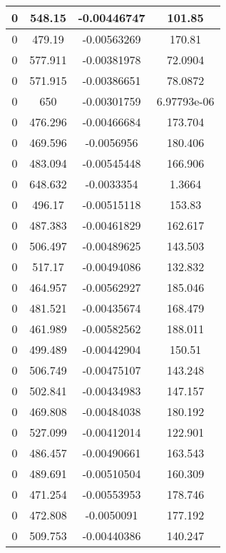\begin{table}[h]
{\begin{tabular}{|c|c|c|c|}
0   &   548.15   &   -0.00446747   &   101.85  \\  \hline  
0   &   479.19   &   -0.00563269   &   170.81  \\  \hline  
0   &   577.911   &   -0.00381978   &   72.0904  \\  \hline  
0   &   571.915   &   -0.00386651   &   78.0872  \\  \hline  
0   &   650   &   -0.00301759   &   6.97793e-06  \\  \hline  
0   &   476.296   &   -0.00466684   &   173.704  \\  \hline  
0   &   469.596   &   -0.0056956   &   180.406  \\  \hline  
0   &   483.094   &   -0.00545448   &   166.906  \\  \hline  
0   &   648.632   &   -0.0033354   &   1.3664  \\  \hline  
0   &   496.17   &   -0.00515118   &   153.83  \\  \hline  
0   &   487.383   &   -0.00461829   &   162.617  \\  \hline  
0   &   506.497   &   -0.00489625   &   143.503  \\  \hline  
0   &   517.17   &   -0.00494086   &   132.832  \\  \hline  
0   &   464.957   &   -0.00562927   &   185.046  \\  \hline  
0   &   481.521   &   -0.00435674   &   168.479  \\  \hline  
0   &   461.989   &   -0.00582562   &   188.011  \\  \hline  
0   &   499.489   &   -0.00442904   &   150.51  \\  \hline  
0   &   506.749   &   -0.00475107   &   143.248  \\  \hline  
0   &   502.841   &   -0.00434983   &   147.157  \\  \hline  
0   &   469.808   &   -0.00484038   &   180.192  \\  \hline  
0   &   527.099   &   -0.00412014   &   122.901  \\  \hline  
0   &   486.457   &   -0.00490661   &   163.543  \\  \hline  
0   &   489.691   &   -0.00510504   &   160.309  \\  \hline  
0   &   471.254   &   -0.00553953   &   178.746  \\  \hline  
0   &   472.808   &   -0.0050091   &   177.192  \\  \hline  
0   &   509.753   &   -0.00440386   &   140.247  \\  \hline  

\end{tabular}}
\end{table}
